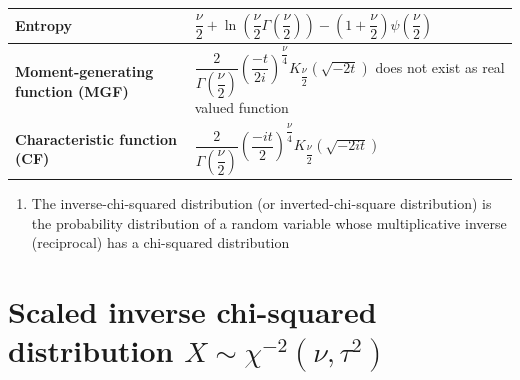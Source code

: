 \begin{longtable}{|m{6cm}|p{9cm}|}
    \textbf{Entropy} &
    ${\displaystyle {\dfrac {\nu }{2}}\!+\!\ln \!\left({\dfrac {\nu }{2}}\Gamma \!\left({\dfrac {\nu }{2}}\right)\right)} {\displaystyle \!-\!\left(1\!+\!{\dfrac {\nu }{2}}\right)\psi \!\left({\dfrac {\nu }{2}}\right)}$
    \\[1ex] \hline

    \textbf{Moment-generating function (MGF)} &
    ${\displaystyle {\dfrac {2}{\Gamma ({\dfrac {\nu }{2}})}}\left({\dfrac {-t}{2i}}\right)^{\!\!{\dfrac {\nu }{4}}}K_{\dfrac {\nu }{2}}\!\left({\sqrt {-2t}}\right)}$ does not exist as real valued function
    \\[1ex] \hline

    \textbf{Characteristic function (CF)} &
    ${\displaystyle {\dfrac {2}{\Gamma ({\dfrac {\nu }{2}})}}\left({\dfrac {-it}{2}}\right)^{\!\!{\dfrac {\nu }{4}}}K_{\dfrac {\nu }{2}}\!\left({\sqrt {-2it}}\right)}$
    \\[1ex] \hline

\end{longtable}
\renewcommand{\arraystretch}{1}



\begin{enumerate}
    \item The inverse-chi-squared distribution (or inverted-chi-square distribution) is the probability distribution of a random variable whose multiplicative inverse (reciprocal) has a chi-squared distribution

\end{enumerate}


\section{Scaled inverse chi-squared distribution $X \sim \chi^{-2}(\nu, \tau^2)$ \cite{wiki/Scaled_inverse_chi-squared_distribution}} \label{Scaled inverse chi-squared distribution}

